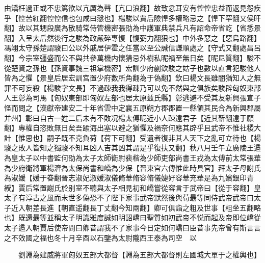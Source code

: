 由矯枉過正或不忠篤欲以亢厲為聲【亢口浪翻】故致忿耳安有悾悾忠益而返見怨疾乎【悾苦紅翻悾悾信也包咸曰慤也】楊駿以賈后險悍多權略忌之【悍下罕翻又侯旰翻】故以其甥段廣為散騎常侍管機密張劭為中護軍典禁兵凡有詔命帝省訖【省悉景翻】入呈太后然後行之駿為政嚴碎專愎【愎弼力翻狠也】中外多惡之【惡烏路翻】馮翊太守孫楚謂駿曰公以外戚居伊霍之任當以至公誠信謙順處之【守式又翻處昌呂翻】今宗室彊盛而公不與共參萬機内懷猜忌外樹私昵禍至無日矣【昵尼質翻】駿不從楚資之孫也【孫資事魏三祖掌機密】宏訓少府蒯欽駿之姑子也數以直言犯駿他人皆為之懼【景皇后居宏訓宫置少府數所角翻為于偽翻】欽曰楊文長雖闇猶知人之無罪不可妄殺【楊駿字文長】不過疎我我得疎乃可以免不然與之俱族矣駿辟匈奴東部人王彰為司馬【匈奴東部即匈奴左部也居太原兹氏縣】彰逃避不受其友新興張宣子怪而問之【漢獻帝建安二十年省雲中定襄五原朔方郡郡置一縣領其民合為新興郡屬并州】彰曰自古一姓二后未有不敗况楊太傅昵近小人疎遠君子【近其靳翻遠于願翻】專權自恣敗無日矣吾踰海出塞以避之猶懼及禍奈何應其辟乎且武帝不惟社稷大計【惟思也】嗣子既不克負荷【荷下可翻】受遺者復非其人天下之亂可立待也【楊駿之敗人皆知之獨駿不知耳凶人吉其凶其謂是乎復扶又翻】秋八月壬午立廣陵王遹為皇太子以中書監何劭為太子太師衛尉裴楷為少師吏部尚書王戎為太傅前太常張華為少府衛將軍楊濟為太保尚書和嶠為少保【晉東宫六傳惟此時具官】拜太子母謝氏為淑媛【媛于眷翻晉志淑妃淑媛淑儀脩華脩容脩儀婕好容華充華是為九嬪銀印青綬】賈后常置謝氏於别室不聽與太子相見初和嶠嘗從容言于武帝曰【從于容翻】皇太子有淳古之風而末世多偽恐不了陛下家事武帝默然後與荀朂等同侍武帝武帝曰太子近入朝差長進【朝直遥翻長丁丈翻今知兩翻】卿可俱詣之粗及世事【粗坐五翻略也】既還朂等並稱太子明識雅度誠如明詔嶠曰聖質如初武帝不悦而起及帝即位嶠從太子遹入朝賈后使帝問曰卿昔謂我不了家事今日定如何嶠曰臣昔事先帝曾有斯言言之不效國之福也冬十月辛酉以石鑒為太尉隴西王泰為司空　以

　　劉淵為建威將軍匈奴五部大都督【淵為五部大都督則左國城大單于之權輿也】

